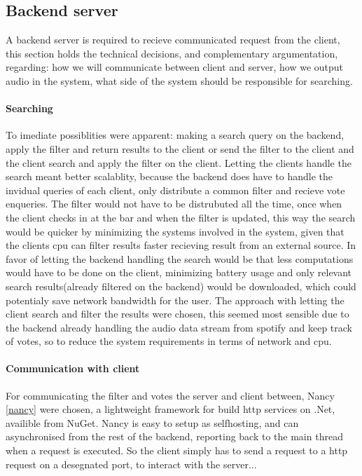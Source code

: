 \subsection{Backend server}

	A backend server is required to recieve communicated request from the client, this section holds the technical decisions, and complementary argumentation, regarding: how we will communicate between client and server, how we output audio in the system, what side of the system should be responsible for searching.

	\paragraph{Searching}
	To imediate possiblities were apparent: making a search query on the backend, apply the filter and return results to the client or send the filter to the client and the client search and apply the filter on the client.
	Letting the clients handle the search meant better scalablity, because the backend does have to handle the invidual queries of each client, only distribute a common filter and recieve vote enqueries. The filter would not have to be distrubuted all the time, once when the client checks in at the bar and when the filter is updated, this way the search would be quicker by minimizing the systems involved in the system, given that the clients cpu can filter results faster recieving result from an external source. In favor of letting the backend handling the search would be that less computations would have to be done on the client, minimizing battery usage and only relevant search results(already filtered on the backend) would be downloaded, which could potentialy save network bandwidth for the user. The approach with letting the client search and filter the results were chosen, this seemed most sensible due to the backend already handling the audio data stream from spotify and keep track of votes, so to reduce the system requirements in terms of network and cpu.

	\paragraph{Communication with client}
	For communicating the filter and votes the server and client between, Nancy \cref{nancy} were chosen, a lightweight framework for build http services on .Net, availible from NuGet. Nancy is easy to setup as selfhosting, and can asynchronised from the rest of the backend, reporting back to the main thread when a request is executed. So the client simply has to send a request to a http request on a desegnated port, to interact with the server...  

